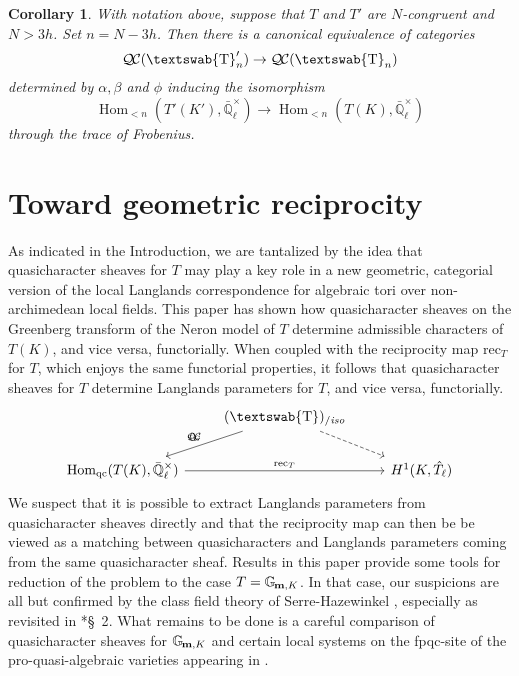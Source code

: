 \documentclass[11pt]{amsart}
\DeclareRobustCommand{\VAN}[3]{#2}
\newcommand{\mathswab}[1]{\operatorname{\textswab{#1}}}
\theoremstyle{plain}
\newtheorem{corollary}[theorem]{Corollary}
\theoremstyle{definition}
\theoremstyle{remark}
\newcommand{\EE}{\mathbb{\bar Q}_\ell}
\newcommand{\EEx}{\EE^\times}
\DeclareMathOperator{\Hom}{Hom}
\newcommand{\Gm}[1]{\mathbb{G}_{\hskip-1pt\textbf{m},#1}}
\newcommand{\GN}[1]{\mathswab{#1}}
\newcommand{\QC}{{\mathcal{Q\hskip-0.8pt C}}}
\newcommand{\QCiso}[1]{\QC(#1)_{/\textit{iso}}}
\newcommand{\trFrob}[1]{t_{#1}}
\begin{document}
\begin{corollary}\label{cor:transfer}
 With notation above, suppose that $T$ and $T'$ are $N$-congruent and $N > 3h$.  Set $n = N-3h$.
 Then there is a canonical equivalence of categories
 \[
  \QC(\GN{T}'_{n}) \to \QC(\GN{T}_{n})
 \]
 determined by $\alpha, \beta$ and $\phi$ inducing the isomorphism
 \[
  \Hom_{<n}(T'(K'), \EEx) \to \Hom_{<n}(T(K), \EEx)
 \]
 through the trace of Frobenius.
\end{corollary}

\section{Toward geometric reciprocity}
\label{sec:reciprocity}

As indicated in the Introduction, we are tantalized 
by the idea that quasicharacter sheaves for $T$ 
may play a key role in a new geometric, categorial version 
of the local Langlands correspondence for algebraic tori 
over non-archimedean local fields. 
%
This paper has shown how quasicharacter sheaves 
on the Greenberg transform of the N\/eron model of $T$ 
determine admissible characters of $T(K)$, and vice versa, functorially.
When coupled with the reciprocity map $\text{rec}_T $ for $T$, 
which enjoys the same functorial properties, 
it follows that quasicharacter sheaves for $T$ 
determine Langlands parameters for $T$, and vice versa, functorially.
\[
\begin{tikzcd}
\ & \arrow[swap]{dl}{\trFrob{G}} \QCiso{\GN{T}} \arrow[dashed]{dr}  & \\
\Hom_{\text{qc}}(T(K),\EEx) \arrow{rr}{\text{rec}_T} && H^1(K,\hat{T}_\ell) 
\end{tikzcd}
\]
We suspect that it is possible to extract Langlands parameters 
from quasicharacter sheaves directly and that the reciprocity map 
can then be be viewed as a matching between quasicharacters and Langlands parameters coming
 from the same quasicharacter sheaf. 
 Results in this paper provide some tools for reduction of the problem to the case $T=\Gm{K}$. 
 In that case, our suspicions are all but confirmed 
 by the class field theory of Serre-Hazewinkel
 ,
 especially as revisited in \cite{suzuki-yoshida:12a}*{\S~2}. 
 What remains to be done is a careful comparison of 
 quasicharacter sheaves for $\Gm{K}$ and certain local systems on
  the fpqc-site of the pro-quasi-algebraic varieties appearing in \cite{suzuki-yoshida:12a}. 


\DeclareRobustCommand{\VAN}[3]{#3}

\end{document}
